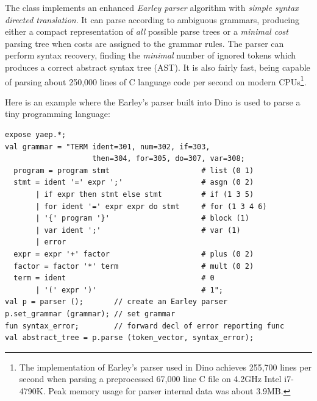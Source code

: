 \documentclass[preprint]{sigplanconf}
\begin{document}
The class implements an enhanced \emph{Earley parser} algorithm with
\emph{simple syntax directed translation}.
It can parse according to ambiguous grammars, producing either a compact representation of \emph{all} possible parse trees or a \emph{minimal cost} parsing tree when costs are assigned to the grammar rules. %
The parser can perform syntax recovery, finding the \emph{minimal}
number of ignored tokens which produces a correct abstract syntax tree (AST).  It is also fairly fast, being capable of parsing about 250,000 lines of C
language code per second on modern CPUs\footnote{The implementation of Earley's parser used in Dino achieves 255,700 lines per second when parsing a preprocessed 67,000 line C file on 4.2GHz Intel i7-4790K. Peak memory usage for parser internal data was about 3.9MB.}.

Here is an example where the Earley's parser built into Dino is used to parse a tiny programming language:

{\scriptsize
\begin{verbatim}
expose yaep.*;
val grammar = "TERM ident=301, num=302, if=303,
                    then=304, for=305, do=307, var=308;
  program = program stmt                     # list (0 1)
  stmt = ident '=' expr ';'                  # asgn (0 2)
       | if expr then stmt else stmt         # if (1 3 5)
       | for ident '=' expr expr do stmt     # for (1 3 4 6)
       | '{' program '}'                     # block (1)
       | var ident ';'                       # var (1)
       | error
  expr = expr '+' factor                     # plus (0 2)
  factor = factor '*' term                   # mult (0 2)
  term = ident                               # 0
       | '(' expr ')'                        # 1";
val p = parser ();       // create an Earley parser
p.set_grammar (grammar); // set grammar
fun syntax_error;        // forward decl of error reporting func
val abstract_tree = p.parse (token_vector, syntax_error);
\end{verbatim}
}
\end{document}
